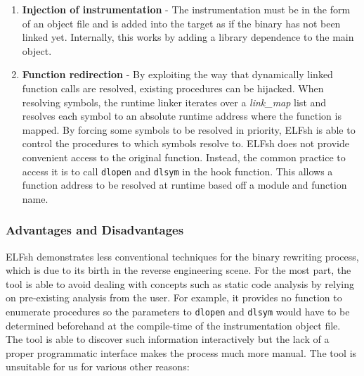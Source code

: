 \begin{enumerate}
 \item \textbf{Injection of instrumentation} - The instrumentation must be in the form of an object file and is added into the target as if the binary has not been linked yet. Internally, this works by adding a library dependence to the main object\cite{cerberus_elf}.
 \item \textbf{Function redirection} - By exploiting the way that dynamically linked function calls are resolved, existing procedures can be hijacked. When resolving symbols, the runtime linker iterates over a \emph{link\_map} list and resolves each symbol to an absolute runtime address where the function is mapped. By forcing some symbols to be resolved in priority, ELFsh is able to control the procedures to which symbols resolve to. ELFsh does not provide convenient access to the original function. Instead, the common practice to access it is to call \texttt{dlopen} and \texttt{dlsym} in the hook function. This allows a function address to be resolved at runtime based off a module and function name.

\end{enumerate}

\subsubsection{Advantages and Disadvantages}

ELFsh demonstrates less conventional techniques for the binary rewriting process, which is due to its birth in the reverse engineering scene. For the most part, the tool is able to avoid dealing with concepts such as static code analysis by relying on pre-existing analysis from the user. For example, it provides no function to enumerate procedures so the parameters to \texttt{dlopen} and \texttt{dlsym} would have to be determined beforehand at the compile-time of the instrumentation object file. The tool is able to discover such information interactively but the lack of a proper programmatic interface makes the process much more manual. The tool is unsuitable for us for various other reasons:

